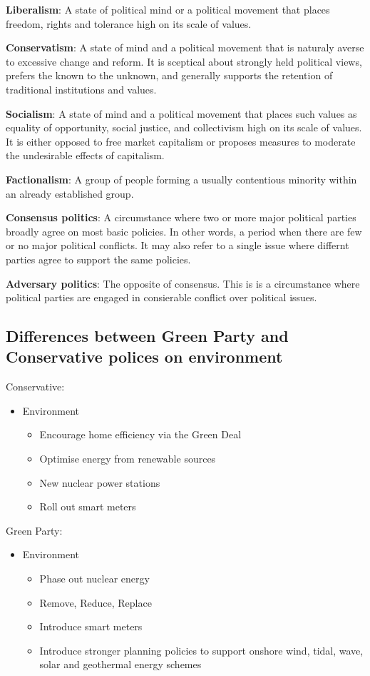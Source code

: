 \documentclass[12pt]{article}
\begin{document}
	\textbf{Liberalism}: A state of political mind or a political movement that places freedom, rights and tolerance high on its scale of values.

	\textbf{Conservatism}: A state of mind and a political movement that is naturaly averse to excessive change and reform.  It is sceptical about strongly held political views, prefers the known to the unknown, and generally supports the retention of traditional institutions and values.

	\textbf{Socialism}: A state of mind and a political movement that places such values as equality of opportunity, social justice, and collectivism high on its scale of values.  It is either opposed to free market capitalism or proposes measures to moderate the undesirable effects of capitalism.

	\textbf{Factionalism}: A group of people forming a usually contentious minority within an already established group. 

	\textbf{Consensus politics}: A circumstance where two or more major political parties broadly agree on most basic policies.  In other words, a period when there are few or no major political conflicts.  It may also refer to a single issue where differnt parties agree to support the same policies. 

	\textbf{Adversary politics}: The opposite of consensus.  This is is a circumstance where political parties are engaged in consierable conflict over political issues.

	\subsection*{Differences between Green Party and Conservative polices on environment}

	Conservative:
	\begin{itemize}
		\item{Environment}
		\begin{itemize}
			\item{Encourage home efficiency via the Green Deal}
			\item{Optimise energy from renewable sources}
			\item{New nuclear power stations}
			\item{Roll out smart meters}
		\end{itemize}
	\end{itemize}

	Green Party:
	\begin{itemize}
		\item{Environment}
		\begin{itemize}
			\item{Phase out nuclear energy}
			\item{Remove, Reduce, Replace}
			\item{Introduce smart meters}
			\item{Introduce stronger planning policies to support onshore wind, tidal, wave, solar and geothermal energy schemes}
		\end{itemize}
	\end{itemize}
\end{document}
